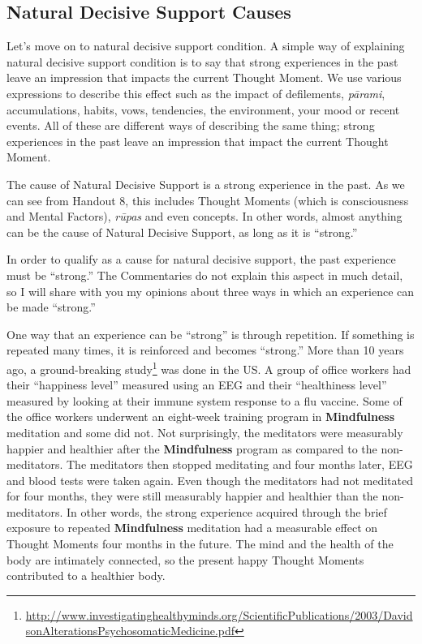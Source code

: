 \subsection*{Natural Decisive Support Causes}

Let’s move on to natural decisive support condition. A simple way of explaining natural decisive support condition is to say that strong experiences in the past leave an impression that impacts the current Thought Moment. We use various expressions to describe this effect such as the impact of defilements, \textit{pārami}, accumulations, habits, vows, tendencies, the environment, your mood or recent events. All of these are different ways of describing the same thing; strong experiences in the past leave an impression that impact the current Thought Moment.

The cause of Natural Decisive Support is a strong experience in the past. As we can see from Handout 8, this includes Thought Moments (which is consciousness and Mental Factors), \textit{rūpas} and even concepts. In other words, almost anything can be the cause of Natural Decisive Support, as long as it is “strong.”

In order to qualify as a cause for natural decisive support, the past experience must be “strong.” The Commentaries do not explain this aspect in much detail, so I will share with you my opinions about three ways in which an experience can be made “strong.”

One way that an experience can be “strong” is through repetition. If something is repeated many times, it is reinforced and becomes “strong.” More than 10 years ago, a ground-breaking study\footnote{\url{http://www.investigatinghealthyminds.org/ScientificPublications/2003/DavidsonAlterationsPsychosomaticMedicine.pdf}} was done in the US. A group of office workers had their “happiness level” measured using an EEG and their “healthiness level” measured by looking at their immune system response to a flu vaccine. Some of the office workers underwent an eight-week training program in \textbf{Mindfulness} meditation and some did not. Not surprisingly, the meditators were measurably happier and healthier after the \textbf{Mindfulness} program as compared to the non-meditators. The meditators then stopped meditating and four months later, EEG and blood tests were taken again. Even though the meditators had not meditated for four months, they were still measurably happier and healthier than the non-meditators. In other words, the strong experience acquired through the brief exposure to repeated \textbf{Mindfulness} meditation had a measurable effect on Thought Moments four months in the future. The mind and the health of the body are intimately connected, so the present happy Thought Moments contributed to a healthier body.

